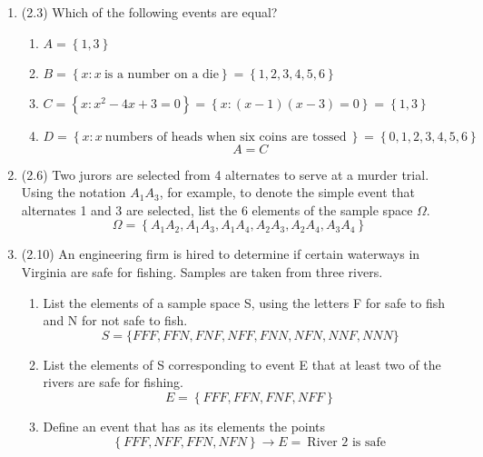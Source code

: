 \documentclass[basic, header]{nosvagor-notes}
\begin{document}
\begin{enumerate}
  \item (2.3) Which of the following events are equal?
    \begin{enumerate}
      \item \(A = \left\{ 1,3 \right\} \)

      \item \(B = \left\{ x : x ~\text{is a number on a die}\right\} = \left\{ 1,2,3,4,5,6 \right\} \)

      \item \(C = \left\{ x : x^2 - 4x + 3 = 0 \right\} = \left\{ x : (x-1)(x-3) = 0\right\}  = \left\{ 1,3 \right\}\)

      \item \(D = \left\{ x : x ~\text{numbers of heads when six coins are tossed}~ \right\} = \left\{ 0,1,2,3,4,5,6 \right\} \)
      \[%
        \boxed{A = C}
      \]%

    \end{enumerate}

 \item (2.6) Two jurors are selected from 4 alternates to serve at a murder
   trial. Using the notation \(A_1A_3\), for example, to denote the simple
   event that alternates 1 and 3 are selected, list the 6 elements of the
   sample space \(\Omega\).
   \[%
     \boxed{\Omega = \left\{ A_1A_2, A_1A_3, A_1A_4, A_2A_3, A_2A_4, A_3A_4 \right\}}
   \]%

  \item (2.10)  An engineering firm is hired to determine if certain waterways
    in Virginia are safe for fishing. Samples are taken from three rivers.
    \begin{enumerate}
      \item  List the elements of a sample space S, using the
        letters F for safe to fish and N for not safe to fish.
        \[%
         \boxed{S = \{FFF, FFN, FNF, NFF, FNN, NFN, NNF, NNN\}}
        \]%

      \item List the elements of S corresponding to event E
        that at least two of the rivers are safe for fishing.
        \[%
          \boxed{E = \left\{ FFF, FFN, FNF, NFF \right\}}
        \]%

      \item  Define an event that has as its elements the points
        \[%
          \left\{ FFF, NFF, FFN, NFN \right\} \to E = ~\text{River 2 is safe}~
        \]%
    \end{enumerate}


\end{enumerate}
\end{document}
